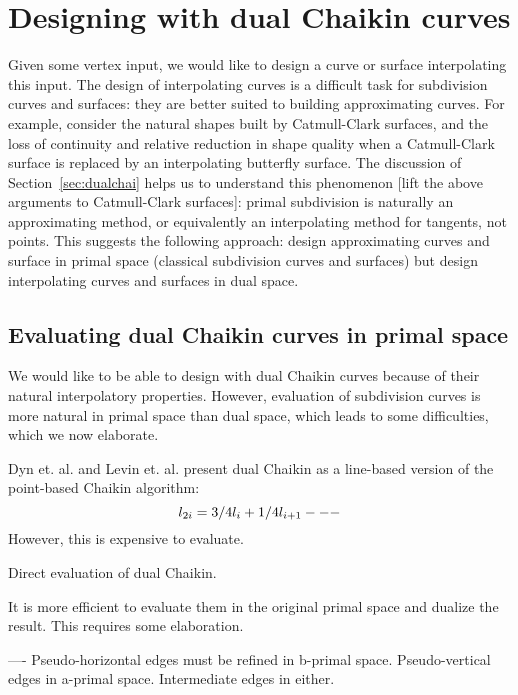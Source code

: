 \documentclass[12pt]{article}
\begin{document}
\clearpage


\section{Designing with dual Chaikin curves}

Given some vertex input, we would like to design a curve or surface interpolating this input.  
The design of interpolating curves is a difficult task 
for subdivision curves and surfaces: 
they are better suited to building approximating curves.
For example, consider the natural shapes built by Catmull-Clark surfaces,
and the loss of continuity and relative reduction in shape quality 
when a Catmull-Clark surface is replaced by an interpolating butterfly surface.
The discussion of Section~\ref{sec:dualchai} helps us to understand this phenomenon
[lift the above arguments to Catmull-Clark surfaces]:
primal subdivision is naturally an approximating method, or equivalently
an interpolating method for tangents, not points.
This suggests the following approach: design approximating curves and surface in primal space
(classical subdivision curves and surfaces) but design interpolating curves and surfaces
in dual space.

\subsection{Evaluating dual Chaikin curves in primal space}

We would like to be able to design with dual Chaikin curves
because of their natural interpolatory properties.
However, evaluation of subdivision curves is more natural in primal space
than dual space, which leads to some difficulties, which we now elaborate.

Dyn et. al. and Levin et. al. present dual Chaikin as a line-based version of 
the point-based Chaikin algorithm:
\[
  l_{2i} = 3/4 l_i + 1/4 l_{i+1} \\
  ---
\]
However, this is expensive to evaluate.

Direct evaluation of dual Chaikin.

It is more efficient to evaluate them in the original primal space
and dualize the result.
This requires some elaboration.

----
Pseudo-horizontal edges must be refined in b-primal space.
Pseudo-vertical edges in a-primal space.
Intermediate edges in either.
\end{document}

